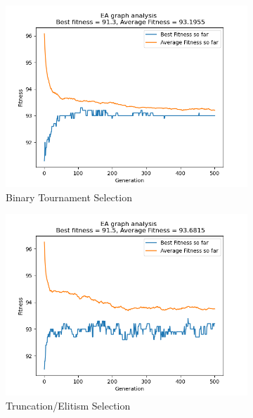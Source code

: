 \documentclass[conference,compsoc]{IEEEtran}
\begin{document}
\begin{figure}[h!]\ContinuedFloat
  \centering
  \begin{subfigure}{0.34\textwidth}
    \includegraphics[width=\linewidth]{../Results/_100_BT_Truncation_200_100_500.png}
    \caption{Binary Tournament Selection}
  \end{subfigure}
  \begin{subfigure}{0.34\textwidth}
    \includegraphics[width=\linewidth]{../Results/_100_Truncation_Truncation_200_100_500.png}
    \caption*{Truncation/Elitism Selection}
  \end{subfigure}
  \begin{subfigure}{0.34\textwidth}

\end{subfigure}
\end{figure}
\end{document}
